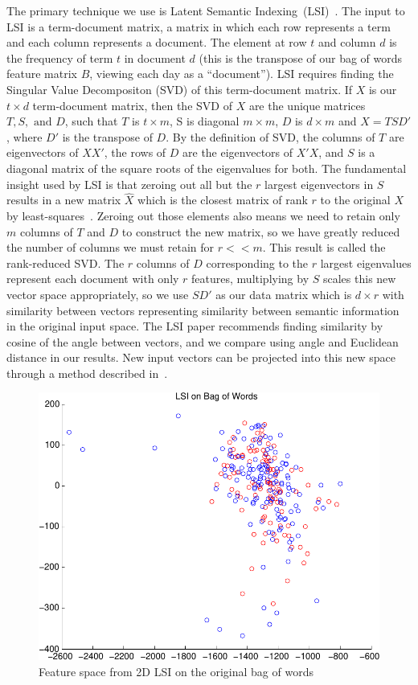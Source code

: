 \documentclass[10pt, twocolumn]{article}
\begin{document}
The primary technique we use is Latent Semantic Indexing~(LSI)~\cite{lsi}. The input to LSI is a term-document matrix, a matrix in which each row represents a term and each column represents a document. The element at row $t$ and column $d$ is the frequency of term $t$ in document $d$ (this is the transpose of our bag of words feature matrix $B$, viewing each day as a ``document''). LSI requires finding the Singular Value Decompositon (SVD) of this term-document matrix. If $X$ is our $t \times d$ term-document matrix, then the SVD of $X$ are the unique matrices $T, S, \text{ and } D$, such that $T$ is $t \times m$, S is diagonal $m \times m$, $D$ is $d \times m$ and $X = T S D'$, where $D'$ is the transpose of $D$. By the definition of SVD, the columns of $T$ are eigenvectors of $X X'$, the rows of $D$ are the eigenvectors of $X' X$, and $S$ is a diagonal matrix of the square roots of the eigenvalues for both. The fundamental insight used by LSI is that zeroing out all but the $r$ largest eigenvectors in $S$ results in a new matrix $\hat{X}$ which is the closest matrix of rank $r$ to the original $X$ by least-squares~\cite{lsi}. Zeroing out those elements also means we need to retain only $m$ columns of $T$ and $D$ to construct the new matrix, so we have greatly reduced the number of columns we must retain for $r << m$. This result is called the rank-reduced SVD. The $r$ columns of $D$ corresponding to the $r$ largest eigenvalues represent each document with only $r$ features, multiplying by $S$ scales this new vector space appropriately, so we use $S D'$ as our data matrix which is $d \times r$ with similarity between vectors representing similarity between semantic information in the original input space. The LSI paper recommends finding similarity by cosine of the angle between vectors, and we compare using angle and Euclidean distance in our results. New input vectors can be projected into this new space through a method described in~\cite{lsi}.


\begin{figure}
\centering
\includegraphics[scale=0.4]{plots/lsiorig.pdf}
\caption{Feature space from 2D LSI on the original bag of words}
\label{lsiorig}
\end{figure}
\end{document}
